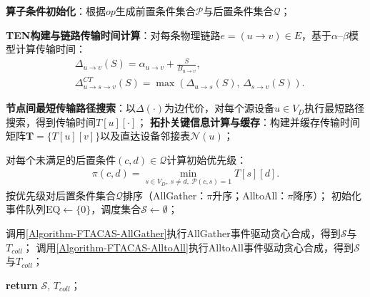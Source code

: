 \begin{center}
\begin{algorithm}[!htbp]
    \caption{FTACAS算法流程}
    \label{Algorithm-FTACAS-Main}
    \begin{algorithmic}[1]

        \STATE \textbf{算子条件初始化}：根据$op$生成前置条件集合$\mathcal{P}$与后置条件集合$\mathcal{Q}$；

        \STATE \textbf{TEN构建与链路传输时间计算}：对每条物理链路$e=(u\rightarrow v)\in E$，基于$\alpha$--$\beta$模型计算传输时间：
        \begin{align*}
            &\Delta_{u\rightarrow v}(S)=\alpha_{u\rightarrow v}+\frac{S}{B_{u\rightarrow v}},\\
            &\Delta_{u\rightarrow s\rightarrow v}^{CT}(S)=\max\left(\Delta_{u\rightarrow s}(S),\,\Delta_{s\rightarrow v}(S)\right).
        \end{align*}


        \STATE \textbf{节点间最短传输路径搜索}：以$\Delta(\cdot)$为边代价，对每个源设备$u\in V_D$执行最短路径搜索，得到传输时间$T[u][\cdot]$；
        \STATE \textbf{拓扑关键信息计算与缓存}：构建并缓存传输时间矩阵$\boldsymbol{T}=\{T[u][v]\}$以及直达设备邻接表$\mathcal{N}(u)$；

        \STATE 对每个未满足的后置条件$(c,d)\in\mathcal{Q}$计算初始优先级：
        \begin{align*}
            \pi(c,d)=\min_{s\in V_D,\ s\neq d,\ \mathcal{P}(c,s)=1} T[s][d] .
        \end{align*}
        \STATE 按优先级对后置条件集合$\mathcal{Q}$排序（AllGather：$\pi$升序；AlltoAll：$\pi$降序）；
        \STATE 初始化事件队列$\mathrm{EQ}\leftarrow \{0\}$，调度集合$\mathcal{S}\leftarrow \emptyset$；

            \STATE 调用\autoref{Algorithm-FTACAS-AllGather}执行AllGather事件驱动贪心合成，得到$\mathcal{S}$与$T_{coll}$；
        \ELSE
            \STATE 调用\autoref{Algorithm-FTACAS-AlltoAll}执行AlltoAll事件驱动贪心合成，得到$\mathcal{S}$与$T_{coll}$；
        \ENDIF

        \STATE \textbf{return} $\mathcal{S},\,T_{coll}$；
    \end{algorithmic}
\end{algorithm}
\end{center}



